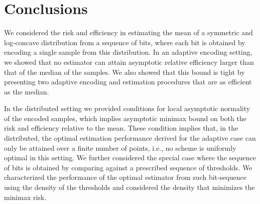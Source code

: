 \section{Conclusions \label{sec:conclusions}}
We considered the risk and efficiency in estimating the mean of a symmetric and log-concave distribution from a sequence of bits, where each bit is obtained by encoding a single sample from this distribution. 
%
In an adaptive encoding setting, we showed that no estimator can attain asymptotic relative efficiency larger than that of the median of the samples. We also showed that this bound is tight by presenting two adaptive encoding and estimation procedures that are as efficient as the median. 
\par
In the distributed setting we provided conditions for local asymptotic normality of the encoded samples, which implies asymptotic minimax bound on both the risk and efficiency relative to the mean. 
%
These condition implies that, in the distributed, the optimal estimation performance derived for the adaptive case can only be attained over a finite number of points, i.e., no scheme is uniformly optimal in this setting. 
%
We further considered the special case where the sequence of bits is obtained by comparing against a prescribed sequence of thresholds. We characterized the performance of the optimal estimator from such bit-sequence using the density of the thresholds and considered the density that minimizes the minimax risk. 
